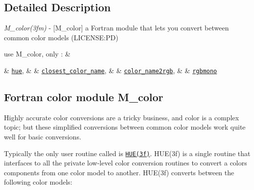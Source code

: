 \subsection{Detailed Description}

\begin{DoxyDescription}
\item[\label{_M_COLOR}%
N\+A\+ME ]

{\itshape M\+\_\+color(3fm)} -\/ \mbox{[}M\+\_\+color\mbox{]} a Fortran module that lets you convert between common color models (L\+I\+C\+E\+N\+SE\+:PD) 


\item[S\+Y\+N\+O\+P\+S\+IS ]
\begin{DoxyPre}\end{DoxyPre}



\begin{DoxyPre}    use M\_color, only : \&\end{DoxyPre}



\begin{DoxyPre}       \& \href{hue.3.html}{\tt hue}, \&
       \& \href{closest_color_name.3.html}{\tt closest\_color\_name}, \&
       \& \href{color_name2rgb.3.html}{\tt color\_name2rgb}, \&
       \& \href{rgbmono.3.html}{\tt rgbmono}
 \end{DoxyPre}
 


\item[D\+E\+S\+C\+R\+I\+P\+T\+I\+ON ]

\subsection*{Fortran color module M\+\_\+color}





Highly accurate color conversions are a tricky business, and color is a complex topic; but these simplified conversions between common color models work quite well for basic conversions. 





Typically the only user routine called is \href{hue.3.html}{\tt H\+U\+E(3f)}. H\+U\+E(3f) is a single routine that interfaces to all the private low-\/level color conversion routines to convert a color\textquotesingle{}s components from one color model to another. H\+U\+E(3f) converts between the following color models\+: 





\end{DoxyDescription}
